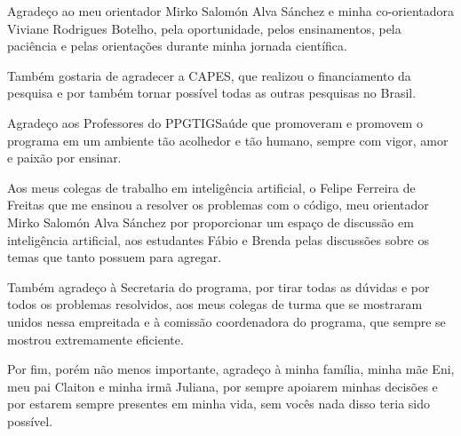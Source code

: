 \pagestyle{empty}

\begin{agradecimentos}


Agradeço ao meu orientador Mirko Salomón Alva Sánchez e minha co-orientadora Viviane Rodrigues Botelho, pela oportunidade, pelos ensinamentos, pela paciência e pelas orientações durante minha jornada científica.

Também gostaria de agradecer a CAPES, que realizou o financiamento da pesquisa e por também tornar possível todas as outras pesquisas no Brasil.

Agradeço aos Professores do PPGTIGSaúde que promoveram e promovem o programa em um ambiente tão acolhedor e tão humano, sempre com vigor, amor e paixão por ensinar.


Aos meus colegas de trabalho em inteligência artificial, o Felipe Ferreira de Freitas que me ensinou a resolver os problemas com o código, meu orientador Mirko Salomón Alva Sánchez por proporcionar um espaço de discussão em inteligência artificial, aos estudantes Fábio e Brenda pelas discussões sobre os temas que tanto possuem para agregar.

Também agradeço à Secretaria do programa, por tirar todas as dúvidas e por todos os problemas resolvidos, aos meus colegas de turma que se mostraram unidos nessa empreitada e à comissão coordenadora do programa, que sempre se mostrou extremamente eficiente.

Por fim, porém não menos importante, agradeço à minha família, minha mãe Eni, meu pai Claiton e minha irmã Juliana, por sempre apoiarem minhas decisões e por estarem sempre presentes em minha vida, sem vocês nada disso teria sido possível.

\end{agradecimentos}
